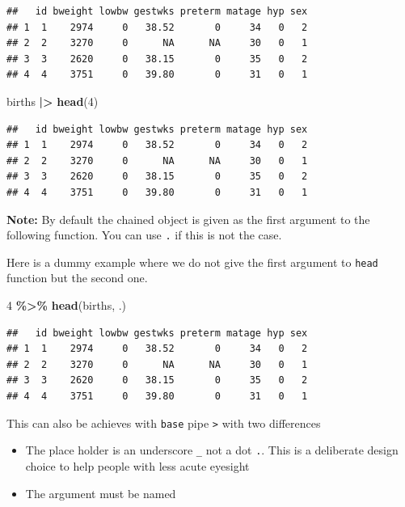 \documentclass[
]{book}
\newenvironment{Shaded}{\begin{snugshade}}{\end{snugshade}}
\newcommand{\DecValTok}[1]{\textcolor[rgb]{0.00,0.00,0.81}{#1}}
\newcommand{\FunctionTok}[1]{\textcolor[rgb]{0.13,0.29,0.53}{\textbf{#1}}}
\newcommand{\NormalTok}[1]{#1}
\newcommand{\SpecialCharTok}[1]{\textcolor[rgb]{0.81,0.36,0.00}{\textbf{#1}}}
\providecommand{\tightlist}{%
  \setlength{\itemsep}{0pt}\setlength{\parskip}{0pt}}
\begin{document}
\begin{verbatim}
##   id bweight lowbw gestwks preterm matage hyp sex
## 1  1    2974     0   38.52       0     34   0   2
## 2  2    3270     0      NA      NA     30   0   1
## 3  3    2620     0   38.15       0     35   0   2
## 4  4    3751     0   39.80       0     31   0   1
\end{verbatim}

\begin{Shaded}
\begin{Highlighting}[]
\NormalTok{births }\SpecialCharTok{|\textgreater{}} \FunctionTok{head}\NormalTok{(}\DecValTok{4}\NormalTok{)}
\end{Highlighting}
\end{Shaded}

\begin{verbatim}
##   id bweight lowbw gestwks preterm matage hyp sex
## 1  1    2974     0   38.52       0     34   0   2
## 2  2    3270     0      NA      NA     30   0   1
## 3  3    2620     0   38.15       0     35   0   2
## 4  4    3751     0   39.80       0     31   0   1
\end{verbatim}

\textbf{Note:} By default the chained object is given as the first argument to the following
function.
You can use \texttt{.} if this is not the case.

Here is a dummy example where we do not give the first argument to \texttt{head} function but the second one.

\begin{Shaded}
\begin{Highlighting}[]
\DecValTok{4} \SpecialCharTok{\%\textgreater{}\%} \FunctionTok{head}\NormalTok{(births, .)}
\end{Highlighting}
\end{Shaded}

\begin{verbatim}
##   id bweight lowbw gestwks preterm matage hyp sex
## 1  1    2974     0   38.52       0     34   0   2
## 2  2    3270     0      NA      NA     30   0   1
## 3  3    2620     0   38.15       0     35   0   2
## 4  4    3751     0   39.80       0     31   0   1
\end{verbatim}

This can also be achieves with \texttt{base} pipe \texttt{\textbar{}\textgreater{}} with two differences

\begin{itemize}
\tightlist
\item
  The place holder is an underscore \texttt{\_} not a dot \texttt{.}. This is a deliberate design choice to help people with less acute eyesight
\item
  The argument must be named
\end{itemize}
\end{document}
